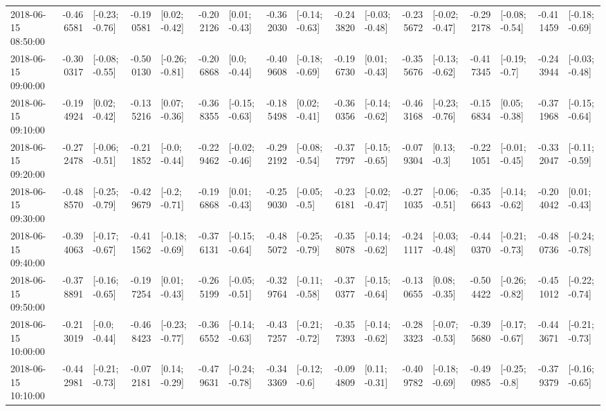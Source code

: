 \begin{tabular}{lrlrlrlrlrlrlrlrl}
2018-06-15 08:50:00 & -0.466581 &  [-0.23; -0.76] & -0.190581 &   [0.02; -0.42] & -0.202126 &   [0.01; -0.43] & -0.362030 &  [-0.14; -0.63] & -0.243820 &  [-0.03; -0.48] & -0.235672 &  [-0.02; -0.47] & -0.292178 &  [-0.08; -0.54] & -0.411459 &  [-0.18; -0.69] \\
2018-06-15 09:00:00 & -0.300317 &  [-0.08; -0.55] & -0.500130 &  [-0.26; -0.81] & -0.206868 &    [0.0; -0.44] & -0.409608 &  [-0.18; -0.69] & -0.196730 &   [0.01; -0.43] & -0.355676 &  [-0.13; -0.62] & -0.417345 &   [-0.19; -0.7] & -0.243944 &  [-0.03; -0.48] \\
2018-06-15 09:10:00 & -0.194924 &   [0.02; -0.42] & -0.135216 &   [0.07; -0.36] & -0.368355 &  [-0.15; -0.63] & -0.185498 &   [0.02; -0.41] & -0.360356 &  [-0.14; -0.62] & -0.463168 &  [-0.23; -0.76] & -0.156834 &   [0.05; -0.38] & -0.371968 &  [-0.15; -0.64] \\
2018-06-15 09:20:00 & -0.272478 &  [-0.06; -0.51] & -0.211852 &   [-0.0; -0.44] & -0.229462 &  [-0.02; -0.46] & -0.292192 &  [-0.08; -0.54] & -0.377797 &  [-0.15; -0.65] & -0.079304 &    [0.13; -0.3] & -0.221051 &  [-0.01; -0.45] & -0.332047 &  [-0.11; -0.59] \\
2018-06-15 09:30:00 & -0.488570 &  [-0.25; -0.79] & -0.429679 &   [-0.2; -0.71] & -0.196868 &   [0.01; -0.43] & -0.259030 &   [-0.05; -0.5] & -0.236181 &  [-0.02; -0.47] & -0.271035 &  [-0.06; -0.51] & -0.356643 &  [-0.14; -0.62] & -0.204042 &   [0.01; -0.43] \\
2018-06-15 09:40:00 & -0.394063 &  [-0.17; -0.67] & -0.411562 &  [-0.18; -0.69] & -0.376131 &  [-0.15; -0.64] & -0.485072 &  [-0.25; -0.79] & -0.358078 &  [-0.14; -0.62] & -0.241117 &  [-0.03; -0.48] & -0.440370 &  [-0.21; -0.73] & -0.480736 &  [-0.24; -0.78] \\
2018-06-15 09:50:00 & -0.378891 &  [-0.16; -0.65] & -0.197254 &   [0.01; -0.43] & -0.265199 &  [-0.05; -0.51] & -0.329764 &  [-0.11; -0.58] & -0.370377 &  [-0.15; -0.64] & -0.130655 &   [0.08; -0.35] & -0.504422 &  [-0.26; -0.82] & -0.451012 &  [-0.22; -0.74] \\
2018-06-15 10:00:00 & -0.213019 &   [-0.0; -0.44] & -0.468423 &  [-0.23; -0.77] & -0.366552 &  [-0.14; -0.63] & -0.437257 &  [-0.21; -0.72] & -0.357393 &  [-0.14; -0.62] & -0.283323 &  [-0.07; -0.53] & -0.395680 &  [-0.17; -0.67] & -0.443671 &  [-0.21; -0.73] \\
2018-06-15 10:10:00 & -0.442981 &  [-0.21; -0.73] & -0.072181 &   [0.14; -0.29] & -0.479631 &  [-0.24; -0.78] & -0.343369 &   [-0.12; -0.6] & -0.094809 &   [0.11; -0.31] & -0.409782 &  [-0.18; -0.69] & -0.490985 &   [-0.25; -0.8] & -0.379379 &  [-0.16; -0.65] \\

\end{tabular}
